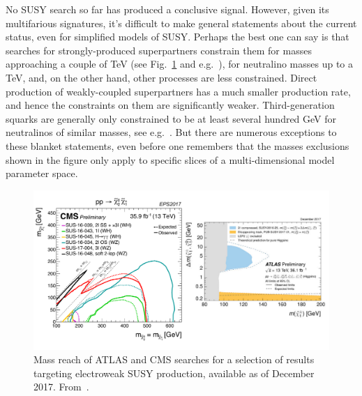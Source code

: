 No SUSY search so far has produced a conclusive signal. However, given its multifarious signatures, it's difficult to make general statements about the current status, even for simplified models of SUSY. Perhaps the best one can say is that searches for strongly-produced superpartners constrain them for masses approaching a couple of TeV (see Fig.~\ref{fig:SUSYSummary_ew} and e.g.~\cite{Aaboud:2017bac,Sirunyan:2017yse}), for neutralino masses up to a TeV, and,
on the other hand, other processes are less constrained.
Direct production of weakly-coupled superpartners has a much smaller production rate, and hence the constraints on them are significantly weaker.
Third-generation squarks are generally only constrained to be at least several hundred GeV for neutralinos of similar masses, see e.g.~\cite{Sirunyan:2017wif,Aaboud:2016wna}.
But there are numerous exceptions to these blanket statements, even before one remembers that the masses exclusions shown in the figure only apply to specific slices of a multi-dimensional model parameter space.

\begin{figure}[!htpb]
\includegraphics[width=\textwidth]{figures/SUSY_electroweak.pdf}
\caption{Mass reach of ATLAS and CMS searches for a selection of results targeting electroweak SUSY production, available as of December 2017. From~\cite{ATLASSUSYSummary,CMSSUSYSummary}.\label{fig:SUSYSummary_ew}}
\end{figure}


